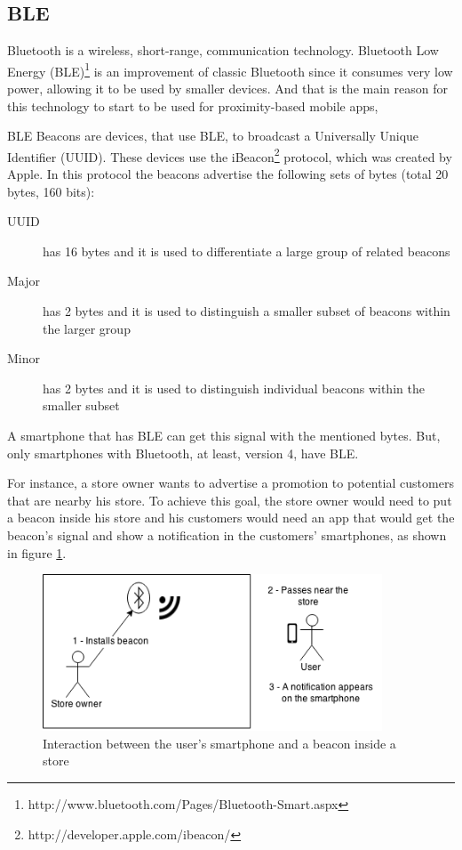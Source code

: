 \subsection{BLE}
\label{sub:bluetooth_low_energy}
Bluetooth is a wireless, short-range, communication technology.
Bluetooth Low Energy (BLE)\footnote{http://www.bluetooth.com/Pages/Bluetooth-Smart.aspx} 
is an improvement of classic Bluetooth since it consumes 
very low power, allowing it to be used by smaller devices.
And that is the main reason for this technology to start to 
be used for proximity-based mobile apps,

BLE Beacons are devices, that use BLE, to broadcast a 
Universally Unique Identifier (UUID). 
These devices use the 
iBeacon\footnote{http://developer.apple.com/ibeacon/} 
protocol, which was created
by Apple\texttrademark. In this protocol the beacons
advertise the following sets of bytes
(total 20 bytes, 160 bits):
\begin{description}
  \item[UUID] has 16 bytes and it is used to differentiate a 
  large group of related beacons
  \item[Major] has 2 bytes and it is used to distinguish a smaller 
  subset of beacons within the larger group
  \item[Minor] has 2 bytes and it is used to distinguish individual
  beacons within the smaller subset
\end{description}
A smartphone that
has BLE can get this signal with the mentioned bytes.
But, only smartphones
with Bluetooth, at least, version 4, have BLE.

For instance, a store owner wants to advertise a promotion
to potential customers that are nearby his store. To 
achieve this goal, the store owner would need to put
a beacon inside his store and his customers would need an
app that would get the beacon's signal and show a 
notification in the customers' smartphones,
as shown in figure \ref{fig:store_example}.
\begin{figure}[!ht]
  \centering
    \includegraphics[width=0.9\textwidth]{img/store_example}
    \caption{Interaction between the user's smartphone
    and a beacon inside a store}
    \label{fig:store_example}
\end{figure}

